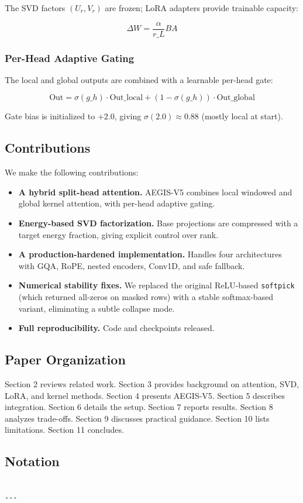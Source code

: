 The SVD factors $(U_r, V_r)$ are frozen; LoRA adapters provide trainable 
capacity:

\[
\Delta W = \frac{\alpha}{r\_L} B A
\]

\subsubsection{Per-Head Adaptive Gating}

The local and global outputs are combined with a learnable per-head gate:

\[
\text{Out} = \sigma(g\_h) \cdot \text{Out}\_\text{local} + (1 - \sigma(g\_h)) \cdot \text{Out}\_\text{global}
\]

Gate bias is initialized to $+2.0$, giving $\sigma(2.0) \approx 0.88$ 
(mostly local at start).

\subsection{Contributions}

We make the following contributions:

\begin{itemize}
\item \textbf{A hybrid split-head attention.} AEGIS-V5 combines local windowed and
  global kernel attention, with per-head adaptive gating.
\item \textbf{Energy-based SVD factorization.} Base projections are compressed with
  a target energy fraction, giving explicit control over rank.
\item \textbf{A production-hardened implementation.} Handles four architectures with
  GQA, RoPE, nested encoders, Conv1D, and safe fallback.
\item \textbf{Numerical stability fixes.} We replaced the original ReLU-based \texttt{softpick}
  (which returned all-zeros on masked rows) with a stable softmax-based
  variant, eliminating a subtle collapse mode.
\item \textbf{Full reproducibility.} Code and checkpoints released.

\end{itemize}
\subsection{Paper Organization}

Section 2 reviews related work. Section 3 provides background on attention, 
SVD, LoRA, and kernel methods. Section 4 presents AEGIS-V5. Section 5 
describes integration. Section 6 details the setup. Section 7 reports 
results. Section 8 analyzes trade-offs. Section 9 discusses practical 
guidance. Section 10 lists limitations. Section 11 concludes.



\subsection{Notation}

\begin{lstlisting}

---
\end{lstlisting}